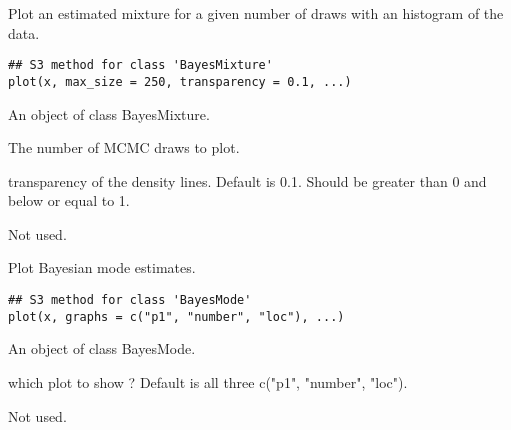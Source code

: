 \documentclass[a4paper]{book}
\begin{document}
%
\begin{Description}\relax
Plot an estimated mixture for a given number of draws with an histogram of the data.
\end{Description}
%
\begin{Usage}
\begin{verbatim}
## S3 method for class 'BayesMixture'
plot(x, max_size = 250, transparency = 0.1, ...)
\end{verbatim}
\end{Usage}
%
\begin{Arguments}
\begin{ldescription}
\item[\code{x}] An object of class BayesMixture.

\item[\code{max\_size}] The number of MCMC draws to plot.

\item[\code{transparency}] transparency of the density lines. Default is 0.1. Should be greater than 0 and below or equal to 1.

\item[\code{...}] Not used.
\end{ldescription}
\end{Arguments}
%
\begin{Description}\relax
Plot Bayesian mode estimates.
\end{Description}
%
\begin{Usage}
\begin{verbatim}
## S3 method for class 'BayesMode'
plot(x, graphs = c("p1", "number", "loc"), ...)
\end{verbatim}
\end{Usage}
%
\begin{Arguments}
\begin{ldescription}
\item[\code{x}] An object of class BayesMode.

\item[\code{graphs}] which plot to show ? Default is all three c("p1", "number", "loc").

\item[\code{...}] Not used.
\end{ldescription}
\end{Arguments}
\end{document}
